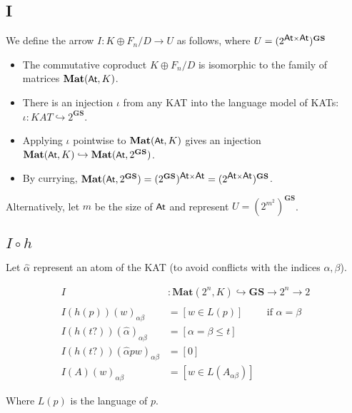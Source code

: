 \documentclass{article}
\newcommand{\atoms}{\textsf{\small{At}}}
\newcommand{\actions}{\Sigma}
\newcommand{\mat}[1]{\textbf{Mat}(#1)}
\newcommand{\gs}{\textbf{GS}}
\newcommand{\universe}{(2^{m^2})^\gs}
\newcommand{\coproduct}{K \oplus F_n / D}
\begin{document}
\subsection*{I}

We define the arrow $I : \coproduct \rightarrow U$ as follows, where $U = (2^{\atoms \times \atoms})^\gs$
\begin{itemize}
\item The commutative coproduct $\coproduct$ is isomorphic to the family of matrices $\mat{\atoms,K}$.
\item There is an injection $\iota$ from any KAT into the language model of KATs: $\iota : KAT \hookrightarrow 2^\gs$.
\item Applying $\iota$ pointwise to $\mat{\atoms,K}$ gives an injection $\mat{\atoms,K} \hookrightarrow \mat{\atoms,2^\gs}$.
\item By currying, $\mat{\atoms,2^\gs} = (2^{\gs})^{\atoms \times \atoms} = (2^{\atoms \times \atoms})^\gs$.
\end{itemize}

Alternatively, let $m$ be the size of $\atoms$ and represent $U = \universe$.

\subsection*{$I \circ h$}

Let $\hat{\alpha}$ represent an atom of the KAT (to avoid conflicts with the indices $\alpha, \beta$).

\begin{align*}
  I &: \mat{2^n,K} \hookrightarrow \gs \rightarrow 2^n \rightarrow 2
\\
\\I(h(p))(w)_{\alpha\beta} &= [ w \in L(p) ] \hspace{1cm} \mbox{if $\alpha = \beta$}
\\I(h(t?))(\hat{\alpha})_{\alpha\beta} &= [ \alpha = \beta \le t ]
\\I(h(t?))(\hat{\alpha}pw)_{\alpha\beta} &= [0]
\\I(A)(w)_{\alpha\beta} &= [ w \in L(A_{\alpha\beta}) ]
\end{align*}

Where $L(p)$ is the language of $p$.


\end{document}
